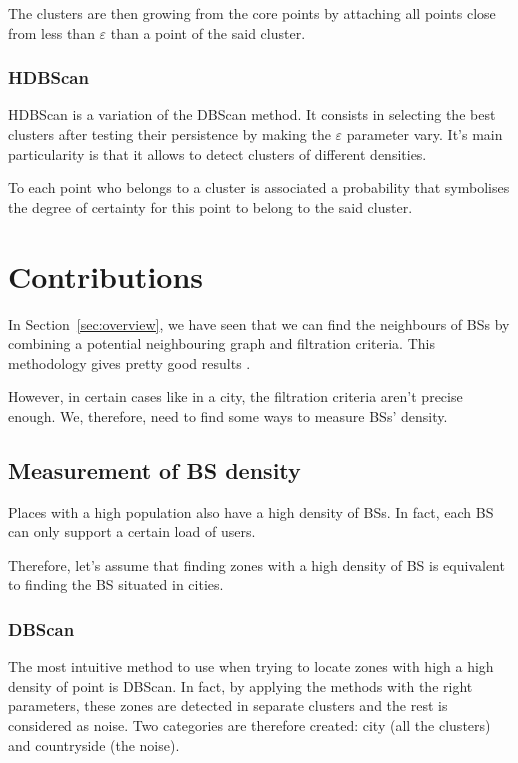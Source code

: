 \documentclass[lettersize,journal,english]{IEEEtran}
\begin{document}
            The clusters are then \og growing\fg{} from the core points by attaching all points close from less than $\varepsilon$ than a point of the said cluster.

        \subsubsection{HDBScan}
            HDBScan \cite{10.1007/978-3-642-37456-2_14} is a variation of the DBScan method.
            It consists in selecting the best clusters after testing their persistence by making the $\varepsilon$ parameter vary. It's main particularity is that it allows to detect clusters of different densities.

            To each point who belongs to a cluster is associated a probability that symbolises the degree of certainty for this point to belong to the said cluster.

\section{Contributions\label{sec:contrib}}
    \noindent In Section~\ref{sec:overview}, we have seen that we can find the neighbours of BSs by combining a potential neighbouring graph and filtration criteria. This methodology gives pretty good results \cite{art_del_paq}.

    However, in certain cases like in a city, the filtration criteria aren't precise enough. We, therefore, need to find some ways to measure BSs' density.

    \subsection{Measurement of BS density}
        Places with a high population also have a high density of BSs. In fact, each BS can only support a certain load of users.

        Therefore, let's assume that finding zones with a high density of BS is equivalent to finding the BS situated in \og cities\fg{}.

        \subsubsection{DBScan}
            The most intuitive method to use when trying to locate zones with high a high density of point is DBScan. In fact, by applying the methods with the right parameters, these zones are detected in separate clusters and the rest is considered as noise. Two categories are therefore created: city (all the clusters) and countryside (the noise).
\end{document}
